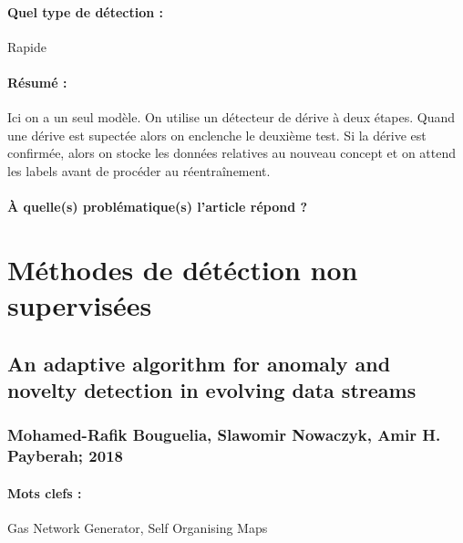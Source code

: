 \documentclass[11pt,a4paper]{report}
\begin{document}
\paragraph{Quel type de détection :} Rapide

\paragraph{Résumé :} Ici on a un seul modèle. On utilise un détecteur de dérive à deux étapes. Quand une dérive est supectée alors on enclenche le deuxième test. Si la dérive est confirmée, alors on stocke les données relatives au nouveau concept et on attend les labels avant de procéder au réentraînement.

\paragraph{À quelle(s) problématique(s) l'article répond ?} 
















\newpage



















\section{Méthodes de détéction non supervisées}

\subsection{An adaptive algorithm for anomaly and novelty detection in evolving data streams}
\subsubsection{Mohamed-Rafik Bouguelia, Slawomir Nowaczyk, Amir H. Payberah; 2018}

\paragraph{Mots clefs :}Gas Network Generator, Self Organising Maps
\end{document}
